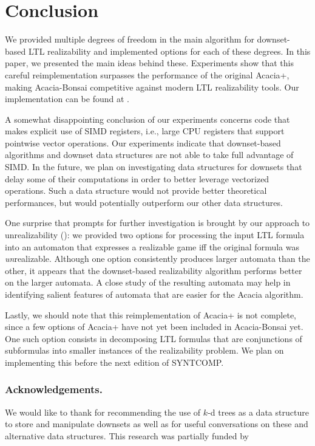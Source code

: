 \documentclass[runningheads,a4paper]{llncs}
\begin{document}
\section{Conclusion}

We provided multiple degrees of freedom in the main algorithm for downset-based
LTL realizability and implemented options for each of these degrees.  In this
paper, we presented the main ideas behind these.  Experiments show that this
careful reimplementation surpasses the performance of the original Acacia+,
making Acacia-Bonsai competitive against modern LTL realizability tools. Our
implementation can be found at
.

A somewhat disappointing conclusion of our experiments concerns code that makes
explicit use of SIMD registers, i.e., large CPU registers that support pointwise
vector operations.  Our experiments indicate that downset-based algorithms and
downset data structures are not able to take full advantage of SIMD.  In the
future, we plan on investigating data structures for downsets that delay some of
their computations in order to better leverage vectorized operations.  Such a
data structure would not provide better theoretical performances, but would
potentially outperform our other data structures.

One surprise that prompts for further investigation is brought by our approach
to unrealizability (): we provided two options for processing
the input LTL formula into an automaton that expresses a realizable game iff the
original formula was \emph{un}realizable.  Although one option consistently
produces larger automata than the other, it appears that the downset-based
realizability algorithm performs better on the larger automata.  A close study
of the resulting automata may help in identifying salient features of automata
that are easier for the Acacia algorithm.

Lastly, we should note that this reimplementation of Acacia+ is not complete,
since a few options of Acacia+ have not yet been included in Acacia-Bonsai yet.
One such option consists in decomposing LTL formulas that are conjunctions of
subformulas into smaller instances of the realizability problem.  We plan on
implementing this before the next edition of SYNTCOMP.

\subsubsection*{Acknowledgements.}
We would like to thank  for recommending the use of
\(k\)-d trees as a data structure to store and manipulate downsets as well as
 for useful conversations on these and alternative data
structures.  This research was partially funded by 



\end{document}
